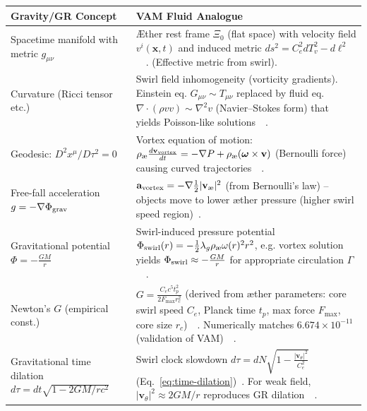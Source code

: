 \documentclass[preprint]{revtex4-2}
\begin{document}
    \begin{table}[H]
        \scriptsize
        \centering
        \begin{tabular}{p{} | p{}}
            \hline
            \textbf{Gravity/GR Concept} & \textbf{VAM Fluid Analogue} \\
            \hline
            Spacetime manifold with metric $g_{\mu\nu}$ & Æther rest frame $\Xi_0$ (flat space) with velocity field $v^i(\mathbf{x},t)$ and induced metric $ds^2 = C_e^2 dT_v^2 - d\ell^2$~\cite{reference_202}~\cite{reference_203}. (Effective metric from swirl). \\
            Curvature (Ricci tensor etc.) & Swirl field inhomogeneity (vorticity gradients). Einstein eq. $G_{\mu\nu} \sim T_{\mu\nu}$ replaced by fluid eq. $\nabla\cdot(\rho v v) \sim \nabla^2 v$ (Navier–Stokes form) that yields Poisson-like solutions~\cite{reference_204}~\cite{reference_205}. \\
            Geodesic: $D^2 x^\mu/D\tau^2 = 0$ & Vortex equation of motion: $\rho_{\text{\ae}}\frac{d\mathbf{v}_{\rm vortex}}{dt} = -\nabla P + \rho_{\text{\ae}}(\boldsymbol{\omega}\times \mathbf{v})$ (Bernoulli force) causing curved trajectories~\cite{reference_206}~\cite{reference_207}. \\
            Free-fall acceleration $g = -\nabla \Phi_{\rm grav}$ & $\mathbf{a}_{\rm vortex} = -\nabla \frac{1}{2}|\mathbf{v}_{\text{\ae}}|^2$ (from Bernoulli’s law) -- objects move to lower æther pressure (higher swirl speed region)~\cite{reference_208}. \\
            Gravitational potential $\Phi = -\frac{GM}{r}$ & Swirl-induced pressure potential $\Phi_{\rm swirl}(r) = -\frac{1}{2}\lambda_g \rho_{\text{\ae}} \omega(r)^2 r^2$, e.g. vortex solution yields $\Phi_{\rm swirl} \approx -\frac{GM}{r}$ for appropriate circulation $\Gamma$~\cite{reference_209}~\cite{reference_210}. \\
            Newton’s $G$ (empirical const.) & $G = \frac{C_e c^5 t_p^2}{2F_{\max} r_c^2}$ (derived from æther parameters: core swirl speed $C_e$, Planck time $t_p$, max force $F_{\max}$, core size $r_c$)~\cite{reference_211}~\cite{reference_212}. Numerically matches $6.674\times10^{-11}$ (validation of VAM)~\cite{reference_213}~\cite{reference_214}. \\
            Gravitational time dilation $d\tau = dt\sqrt{1-2GM/rc^2}$ & Swirl clock slowdown $d\tau = dN\sqrt{1 - \frac{|\mathbf{v}_\theta|^2}{C_e^2}}$ (Eq.~\ref{eq:time-dilation})~\cite{reference_215}. For weak field, $|\mathbf{v}_\theta|^2\approx 2GM/r$ reproduces GR dilation~\cite{reference_216}~\cite{reference_217}. \\

\end{tabular}
\end{table}
\end{document}

